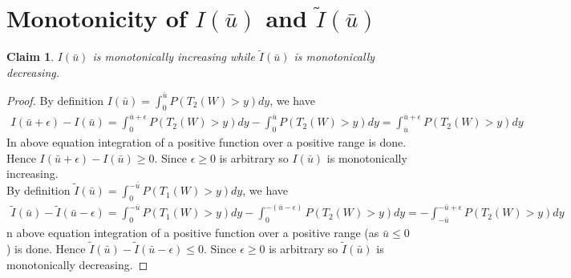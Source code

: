\documentclass[12pt, a4paper]{report}
\newtheorem{claim}[thm]{Claim}
\begin{document}
\section{Monotonicity of $I(\bar{u})$ and $\tilde{I}(\bar{u})$ }
\begin{claim}
$I(\bar{u})$ is monotonically increasing while $\tilde{I}(\bar{u})$ is monotonically decreasing.
\end{claim}
\begin{proof}
By definition $I(\bar{u}) = \int_0^{\bar{u}}P(T_2(W)>y)dy$, we have
\begin{eqnarray}
I(\bar{u}+\epsilon) - I(\bar{u}) = \int_0^{\bar{u}+\epsilon}P(T_2(W)>y)dy -\int_0^{\bar{u}}P(T_2(W)>y)dy = \int_{\bar{u}}^{\bar{u}+\epsilon}P(T_2(W)>y)dy
\end{eqnarray}
In above equation integration of a positive function over a positive range is done. Hence $I(\bar{u}+\epsilon) - I(\bar{u}) \geq 0$. Since $\epsilon \geq 0$ is arbitrary so $I(\bar{u})$ is monotonically increasing.\\
By definition $\tilde{I}(\bar{u}) = \int_0^{-\bar{u}}P(T_1(W)>y)dy$, we have
\begin{eqnarray}\nonumber
\tilde{I}(\bar{u}) - \tilde{I}(\bar{u} -\epsilon) = \int_0^{-\bar{u}}P(T_1(W)>y)dy -\int_0^{-(\bar{u}-\epsilon)}P(T_2(W)>y)dy = -\int_{-\bar{u}}^{-\bar{u}+\epsilon}P(T_2(W)>y)dy
\end{eqnarray}
n above equation integration of a positive function over a positive range (as $\bar{u} \leq 0$) is done. Hence $\tilde{I}(\bar{u}) - \tilde{I}(\bar{u} -\epsilon) \leq 0 $. Since $\epsilon \geq 0$ is arbitrary so $\tilde{I}(\bar{u})$ is monotonically decreasing.
\end{proof}



\end{document}
